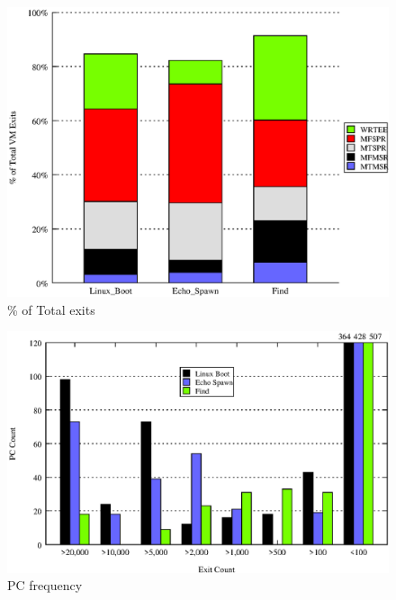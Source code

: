 \documentclass[10pt,twocolumn]{article}
\begin{document}
\begin{figure}[!htb]
\centering

\includegraphics[scale=0.5]{exit_count.eps}
\caption{\% of Total exits}
\label{fig:opcode_ti_fraction}
\end{figure}

\begin{figure}[!htb]
\centering

\includegraphics[scale=0.5]{pc_count.eps}
\caption{PC frequency}
\label{fig:pc_profile}
\end{figure}
\end{document}
